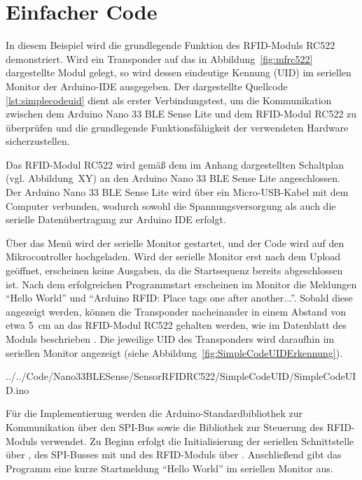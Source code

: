 \section{Einfacher Code}

In diesem Beispiel wird die grundlegende Funktion des RFID-Moduls RC522 demonstriert. 
Wird ein Transponder auf das in Abbildung~\ref{fig:mfrc522} dargestellte Modul gelegt, 
so wird dessen eindeutige Kennung (UID) im seriellen Monitor der Arduino-IDE ausgegeben. 
Der dargestellte Quellcode \ref{lst:simplecodeuid} dient als erster Verbindungstest, 
um die Kommunikation zwischen dem Arduino Nano 33 BLE Sense Lite und dem RFID-Modul RC522 zu überprüfen 
und die grundlegende Funktionsfähigkeit der verwendeten Hardware sicherzustellen.

Das RFID-Modul RC522 wird gemäß dem im Anhang dargestellten Schaltplan (vgl. Abbildung~XY) 
an den Arduino Nano 33 BLE Sense Lite angeschlossen. 
Der Arduino Nano 33 BLE Sense Lite wird über ein Micro-USB-Kabel mit dem Computer verbunden, 
wodurch sowohl die Spannungsversorgung als auch die serielle Datenübertragung zur Arduino IDE erfolgt.

Über das Menü  wird der serielle Monitor gestartet, 
und der Code wird auf den Mikrocontroller hochgeladen. 
Wird der serielle Monitor erst nach dem Upload geöffnet, 
erscheinen keine Ausgaben, da die Startsequenz bereits abgeschlossen ist. 
Nach dem erfolgreichen Programmstart erscheinen im Monitor die Meldungen 
\enquote{Hello World} und \enquote{Arduino RFID: Place tags one after another...}. 
Sobald diese angezeigt werden, können die Transponder nacheinander 
in einem Abstand von etwa \SI{5}{\centi\metre} an das RFID-Modul RC522 gehalten werden, 
wie im Datenblatt des Moduls beschrieben \cite{Handsontec:2023}. 
Die jeweilige UID des Transponders wird daraufhin im seriellen Monitor angezeigt 
(siehe Abbildung~\ref{fig:SimpleCodeUIDErkennung}).

\begin{code}
	\caption{Einfacher Code zum Auslesen der UID eines Transponders}
	\label{lst:simplecodeuid}
	\ArduinoExternal{}
	{../../Code/Nano33BLESense/SensorRFIDRC522/SimpleCodeUID/SimpleCodeUID.ino}
\end{code}

Für die Implementierung werden die Arduino-Standardbibliothek  
zur Kommunikation über den SPI-Bus sowie die Bibliothek  
zur Steuerung des RFID-Moduls verwendet. 
Zu Beginn erfolgt die Initialisierung der seriellen Schnittstelle über , 
des SPI-Busses mit  und des RFID-Moduls über . 
Anschließend gibt das Programm eine kurze Startmeldung \enquote{Hello World} im seriellen Monitor aus. 


